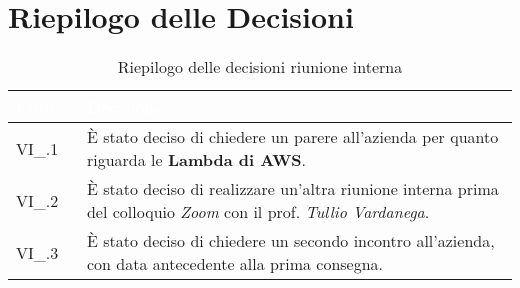 \section{Riepilogo delle Decisioni}


\begin{table}[!htbp]
\renewcommand{\arraystretch}{1.5}
\begin{tabular}{m{}<{\centering}  m{}<{\centering}}
\rowcolor{darkblue} \textcolor{white}{\textbf{Codice}} & \textcolor{white}{\textbf{Decisione}} \\
\hline
VI\_\D{}.1 & È stato deciso di chiedere un parere all'azienda per quanto riguarda le \textbf{Lambda di AWS}.\\
\rowcolor{gray!25} VI\_\D{}.2 &  È stato deciso di realizzare un'altra riunione interna prima del colloquio \textit{Zoom} con il prof. \textit{Tullio Vardanega}.\\
VI\_\D{}.3 & È stato deciso di chiedere un secondo incontro all'azienda, con data antecedente alla prima consegna.\\
\end{tabular}
\caption{Riepilogo delle decisioni riunione interna \D{}}
\end{table}
